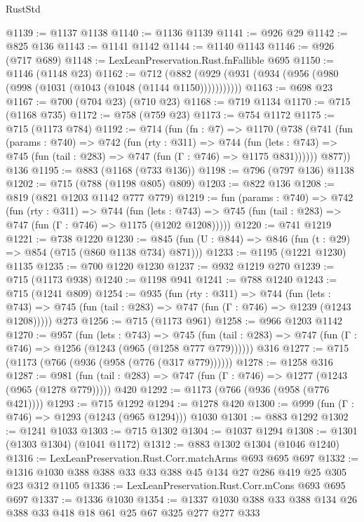 \begin{lexlean}{RustStd}
\begin{coremodule}
{\begin{coremodule}
{{{{{{{{@1139 := @1137 @1138
@1140 := @1136 @1139
@1141 := @926 @29
@1142 := @825 @136
@1143 := @1141 @1142
@1144 := @1140 @1143
@1146 := @926 (@717 @689)
@1148 := LexLeanPreservation.Rust.fnFallible @695
@1150 := @1146 (@1148 @23)
@1162 := @712 (@882 (@929 (@931 (@934 (@956 (@980 (@998 (@1031 (@1043 (@1048 (@1144 @1150)))))))))))
@1163 := @698 @23
@1167 := @700 (@704 @23) (@710 @23)
@1168 := @719 @1134
@1170 := @715 (@1168 @735)
@1172 := @758 (@759 @23)
@1173 := @754 @1172
@1175 := @715 (@1173 @784)
@1192 := @714
    (fun (fn : @7) =>
    @1170
      (@738
        (@741
          (fun (params : @740) =>
          @742
            (fun (rty : @311) =>
            @744
              (fun (lets : @743) =>
              @745 (fun (tail : @283) => @747 (fun (Γ : @746) => @1175 @831))))))
        @877))
    @136
@1195 := @883 (@1168 (@733 @136))
@1198 := @796 (@797 @136) @1138
@1202 := @715 (@788 (@1198 @805) @809)
@1203 := @822 @136
@1208 := @819 (@821 @1203 @1142 @777 @779)
@1219 := fun (params : @740) =>
  @742
    (fun (rty : @311) =>
    @744
      (fun (lets : @743) =>
      @745 (fun (tail : @283) => @747 (fun (Γ : @746) => @1175 (@1202 @1208)))))
@1220 := @741 @1219
@1221 := @738 @1220
@1230 := @845 (fun (U : @844) => @846 (fun (t : @29) => @854 (@715 (@860 @1138 @734) @871)))
@1233 := @1195 (@1221 @1230) @1135
@1235 := @700 @1220 @1230
@1237 := @932 @1219 @270
@1239 := @715 (@1173 @938)
@1240 := @1198 @941
@1241 := @788 @1240
@1243 := @715 (@1241 @809)
@1254 := @935
    (fun (rty : @311) =>
    @744
      (fun (lets : @743) =>
      @745 (fun (tail : @283) => @747 (fun (Γ : @746) => @1239 (@1243 @1208)))))
    @273
@1256 := @715 (@1173 @961)
@1258 := @966 @1203 @1142
@1270 := @957
    (fun (lets : @743) =>
    @745 (fun (tail : @283) => @747 (fun (Γ : @746) => @1256 (@1243 (@965 (@1258 @777 @779))))))
    @316
@1277 := @715 (@1173 (@766 (@936 (@958 (@776 (@317 @779))))))
@1278 := @1258 @316
@1287 := @981 (fun (tail : @283) => @747 (fun (Γ : @746) => @1277 (@1243 (@965 (@1278 @779))))) @420
@1292 := @1173 (@766 (@936 (@958 (@776 @421))))
@1293 := @715 @1292
@1294 := @1278 @420
@1300 := @999 (fun (Γ : @746) => @1293 (@1243 (@965 @1294))) @1030
@1301 := @883 @1292
@1302 := @1241 @1033
@1303 := @715 @1302
@1304 := @1037 @1294
@1308 := @1301 (@1303 @1304) (@1041 @1172)
@1312 := @883 @1302 @1304 (@1046 @1240)
@1316 := LexLeanPreservation.Rust.Corr.matchArms @693 @695 @697
@1332 := @1316 @1030 @388 @388 @33 @33 @388 @45 @134 @27 @286 @419 @25 @305 @23 @312 @1105
@1336 := LexLeanPreservation.Rust.Corr.mCons @693 @695 @697
@1337 := @1336 @1030
@1354 := @1337 @1030 @388 @33 @388 @134 @26 @388 @33 @418 @18 @61 @25 @67 @325 @277 @277 @333
}}}}}}}}
\end{coremodule}}
\end{coremodule}
\end{lexlean}
